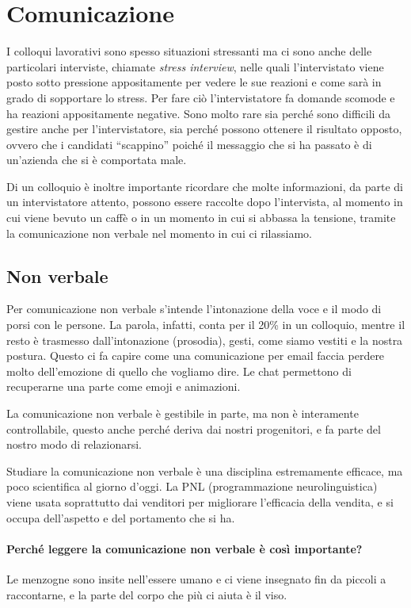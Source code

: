\section{Comunicazione}
I colloqui lavorativi sono spesso situazioni stressanti ma ci sono anche delle
particolari interviste, chiamate \emph{stress interview}, nelle quali
l'intervistato viene posto sotto pressione appositamente per vedere le sue
reazioni e come sarà in grado di sopportare lo stress. Per fare ciò
l'intervistatore fa domande scomode e ha reazioni appositamente negative. Sono
molto rare sia perché sono difficili da gestire anche per l'intervistatore, sia
perché possono ottenere il risultato opposto, ovvero che i candidati
``scappino'' poiché il messaggio che si ha passato è di un'azienda che si è
comportata male.

Di un colloquio è inoltre importante ricordare che molte informazioni, da parte
di un intervistatore attento, possono essere raccolte dopo l'intervista, al
momento in cui viene bevuto un caffè o in un momento in cui si abbassa la
tensione, tramite la comunicazione non verbale nel momento in cui ci
rilassiamo.

\subsection{Non verbale}

Per comunicazione non verbale s'intende l'intonazione della voce e il modo di
porsi con le persone. La parola, infatti, conta per il 20\% in un colloquio,
mentre il resto è trasmesso dall'intonazione (prosodia), gesti, come siamo
vestiti e la nostra postura. Questo ci fa capire come una comunicazione per
email faccia perdere molto dell'emozione di quello che vogliamo dire. Le chat
permettono di recuperarne una parte come emoji e animazioni.

La comunicazione non verbale è gestibile in parte, ma non è interamente
controllabile, questo anche perché deriva dai nostri progenitori, e fa parte
del nostro modo di relazionarsi.

Studiare la comunicazione non verbale è una disciplina estremamente efficace,
ma poco scientifica al giorno d'oggi. La PNL (programmazione neurolinguistica)
viene usata soprattutto dai venditori per migliorare l'efficacia della vendita,
e si occupa dell'aspetto e del portamento che si ha.

\paragraph*{Perché leggere la comunicazione non verbale è così importante?} Le
menzogne sono insite nell'essere umano e ci viene insegnato fin da piccoli a
raccontarne, e la parte del corpo che più ci aiuta è il viso.\\[0.3cm]

